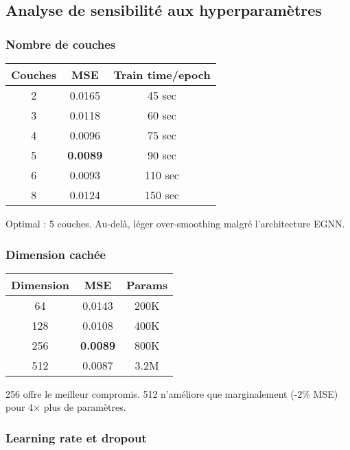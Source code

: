\subsection{Analyse de sensibilité aux hyperparamètres}

\subsubsection{Nombre de couches}

\begin{center}
\begin{tabular}{|c|c|c|}
\hline
\textbf{Couches} & \textbf{MSE} & \textbf{Train time/epoch} \\
\hline
2 & 0.0165 & 45 sec \\
3 & 0.0118 & 60 sec \\
4 & 0.0096 & 75 sec \\
5 & \textbf{0.0089} & 90 sec \\
6 & 0.0093 & 110 sec \\
8 & 0.0124 & 150 sec \\
\hline
\end{tabular}
\end{center}

Optimal : 5 couches. Au-delà, léger over-smoothing malgré l'architecture EGNN.

\subsubsection{Dimension cachée}

\begin{center}
\begin{tabular}{|c|c|c|}
\hline
\textbf{Dimension} & \textbf{MSE} & \textbf{Params} \\
\hline
64 & 0.0143 & 200K \\
128 & 0.0108 & 400K \\
256 & \textbf{0.0089} & 800K \\
512 & 0.0087 & 3.2M \\
\hline
\end{tabular}
\end{center}

256 offre le meilleur compromis. 512 n'améliore que marginalement (-2\% MSE) pour 4× plus de paramètres.

\subsubsection{Learning rate et dropout}

